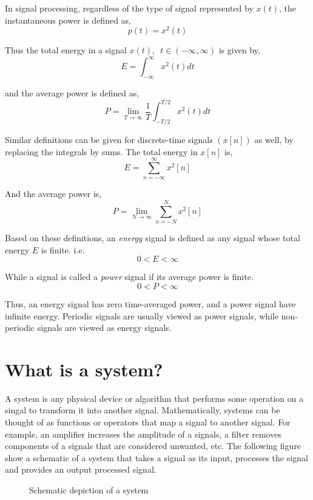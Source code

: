 In signal processing, regardless of the type of signal represented by $x\left(t\right)$, the instantaneous power is defined as,
\[ p\left(t\right) = x^{2}\left(t\right) \]

\noindent Thus the total energy in a signal $x\left(t\right), \,\,\, t \in (-\infty, \infty)$ is given by,
\[ E = \int_{-\infty}^{\infty} x^{2}\left(t\right) dt \]

\noindent and the average power is defined as,
\[ P = \lim_{T \to \infty} \frac{1}{T} \int_{-T/2}^{T/2} x^{2}\left(t\right) dt \]

Similar definitions can be given for discrete-time signals $\left(x\left[n\right]\right)$ as well, by replacing the integrals by sums. The total energy in $x\left[n\right]$ is,
\[ E = \sum_{n=-\infty}^{\infty} x^{2}\left[n\right] \]

\noindent And the average power is,
\[ P = \lim_{N \to \infty} \sum_{n=-N}^{N} x^{2}\left[n\right] \]

\noindent Based on these definitions, an \textit{energy} signal is defined as any signal whose total energy $E$ is finite. i.e.
\[ 0 < E < \infty \]

\noindent While a signal is called a \textit{power} signal if its average power is finite.
$$0 < P < \infty$$

Thus, an energy signal has zero time-averaged power, and a power signal have infinite energy. Periodic signals are usually viewed as power signals, while non-periodic signals are viewed as energy signals.

\section{What is a system?}
A system is any physical device or algorithm that performs some operation on a singal to transform it into another signal. Mathematically, systems can be thought of as functions or operators that map a signal to another signal. For example, an amplifier increases the amplitude of a signals, a filter removes components of a signals that are considered unwanted, etc. The following figure show a schematic of a system that takes a signal as its input, processes the signal and provides an output processed signal.

\begin{figure}[h]
\centering
\caption{Schematic depiction of a system} \label{fig:ch1_system}
\end{figure}

